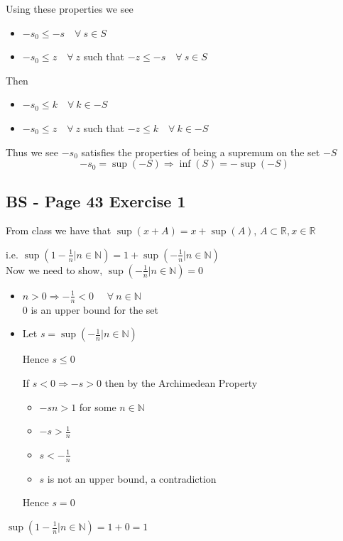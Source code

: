 \documentclass{article}
\begin{document}
Using these properties we see 
\begin{itemize}
    \item \(-s_0 \leq -s \quad \forall \ s \in S\)
    \item \( -s_0 \leq z \quad \forall \ z\) such that \( -z \leq -s \quad \forall \ s \in S\)
\end{itemize}

Then
\begin{itemize}
    \item \(-s_0 \leq k \quad \forall \  k \in -S\)
    \item \( -s_0 \leq z \quad \forall \ z\) such that \( -z \leq k \quad \forall \ k \in -S\)
\end{itemize}

Thus we see \(-s_0\) satisfies the properties of being a supremum on the set \(-S\)
\[
-s_0 = \sup (-S) \Rightarrow \inf(S)  = -\sup (-S)
\]



\subsection*{BS - Page 43 Exercise 1}
From class we have that \(\sup(x+A) = x + \sup(A)\), \(A \subset \mathbb{R}, x \in \mathbb{R}\)

i.e. \(\sup(1- \frac{1}{n}| n \in \mathbb{N}) = 1 + \sup(-\frac{1}{n}| n \in \mathbb{N})\)
\\

Now we need to show, \(\sup(-\frac{1}{n}| n \in \mathbb{N}) = 0\)

\begin{itemize}
    \item \(n > 0 \Rightarrow -\frac{1}{n} < 0\) \(\quad \forall \ n \in \mathbb{N}\)
    \\ 
    0 is an upper bound for the set

    \item Let \(s = \sup(-\frac{1}{n}| n \in \mathbb{N})\)
    
    Hence \(s \leq 0\)

    If \(s < 0 \Rightarrow -s > 0\) then by the Archimedean Property 
    \begin{itemize}
        \item \(-sn > 1\) for some \(n \in \mathbb{N}\)
        \item \(-s > \frac{1}{n}\)
        \item \(s < - \frac{1}{n}\)
        \item \(s\) is not an upper bound, a contradiction
    \end{itemize}

    Hence \(s = 0\)
\end{itemize}

\(\sup(1- \frac{1}{n}| n \in \mathbb{N}) = 1 + 0 = 1\)
\end{document}
